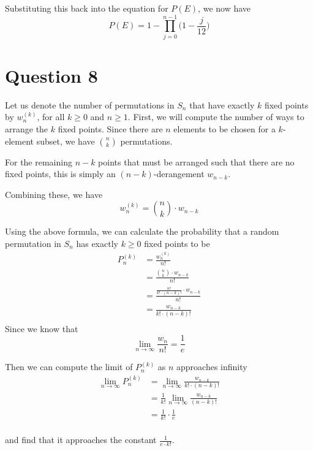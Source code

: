 \documentclass[11pt, oneside]{article}   	%
\begin{document}
Substituting this back into the equation for $P(E)$, we now have
$$P(E) = 1 - \prod_{j=0}^{n-1} \Big(1- \frac{j}{12} \Big)$$

\cleardoublepage

\section*{Question 8}

Let us denote the number of permutations in $S_n$ that have exactly $k$ fixed points by $w_n^{(k)}$, for all $k \geq 0$ and $n \geq 1$. First, we will compute the number of ways to arrange the $k$ fixed points. Since there are $n$ elements to be chosen for a $k$-element subset, we have $n \choose k$ permutations.

For the remaining $n-k$ points that must be arranged such that there are no fixed points, this is simply an $(n-k)$-derangement $w_{n-k}$.

Combining these, we have
$$w_n^{(k)} = {n \choose k} \cdot w_{n-k}$$

Using the above formula, we can calculate the probability that a random permutation in $S_n$ has exactly $k \geq 0$ fixed points to be
\begin{align*}
	P_n^{(k)} & = \frac{w_n^{(k)}}{n!} \\
	& = \frac{{n \choose k} \cdot w_{n-k}}{n!} \\
	& = \frac{\frac{n!}{k! \cdot (n-k)!} \cdot w_{n-k}}{n!} \\
	& = \frac{w_{n-k}}{k! \cdot (n-k)!} \\
\end{align*}
Since we know that
$$\lim_{n\to\infty} \frac{w_n}{n!} = \frac{1}{e}$$

Then we can compute the limit of $P_n^{(k)}$ as $n$ approaches infinity
\begin{align*}
	\lim_{n\to\infty} P_n^{(k)} & = \lim_{n\to\infty} \frac{w_{n-k}}{k! \cdot (n-k)!} \\
	& = \frac{1}{k!} \lim_{n\to\infty} \frac{w_{n-k}}{(n-k)!} \\
	& = \frac{1}{k!} \cdot  \frac{1}{e} \\
\end{align*}

and find that it approaches the constant $\frac{1}{e \cdot k!}$.
\end{document}
